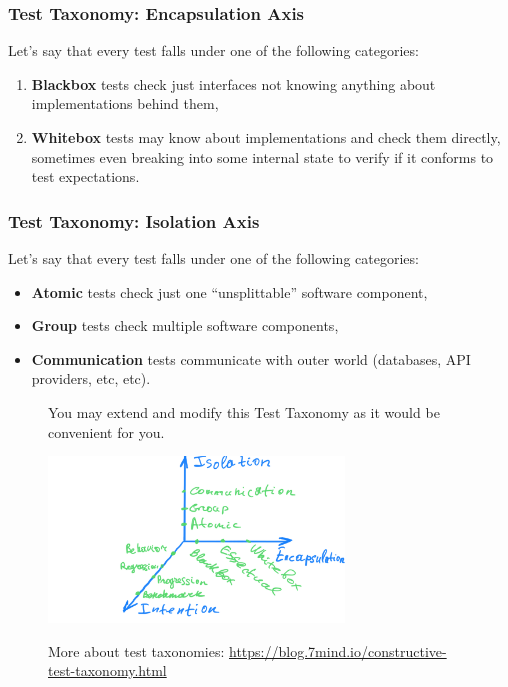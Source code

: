 \documentclass[usenames,dvipsnames,aspectratio=169]{beamer}
\begin{document}
\begin{frame}
  \frametitle{Test Taxonomy: Encapsulation Axis}
  Let's say that every test falls under one of the following categories:

  \begin{enumerate}
    \item \textbf{Blackbox} tests check just interfaces not knowing anything about implementations behind them,
    \item \textbf{Whitebox} tests may know about implementations and check them directly, sometimes even breaking into some internal state to verify if it conforms to test expectations.
  \end{enumerate}
\end{frame}

\begin{frame}
  \frametitle{Test Taxonomy: Isolation Axis}
  Let's say that every test falls under one of the following categories:

  \begin{itemize}
    \item \textbf{Atomic} tests check just one ``unsplittable'' software component,
    \item \textbf{Group} tests check multiple software components,
    \item \textbf{Communication} tests communicate with outer world (databases, API providers, etc, etc).
  \end{itemize}
\end{frame}

\begin{frame}
  \begin{figure}
  \large You may extend and modify this Test Taxonomy as it would be convenient for you.
  \end{figure}

  \begin{figure}
    \includegraphics[width=0.7\textwidth]{media/ctt.png}
  \end{figure}

  \begin{figure}
  More about test taxonomies: \url{https://blog.7mind.io/constructive-test-taxonomy.html}
  \end{figure}
\end{frame}
\end{document}
